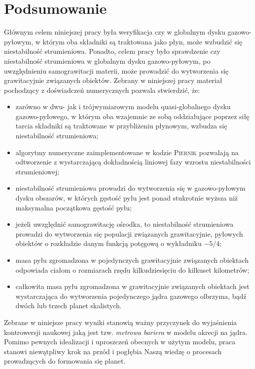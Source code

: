 
\chapter{Podsumowanie}

Głównym celem niniejszej pracy była weryfikacja czy w globalnym dysku
gazowo-pyłowym, w którym oba składniki są traktowana jako płyn, może wzbudzić
się niestabilność strumieniowa. Ponadto, celem pracy było sprawdzenie czy
niestabilność strumieniowa w globalnym dysku gazowo-pyłowym, po uwzględnieniu
samograwitacji materii, może prowadzić do wytworzenia się grawitacyjnie
związanych obiektów. Zebrany w niniejszej pracy materiał pochodzący z
doświadczeń numerycznych pozwala stwierdzić, że:
\begin{itemize}
   \item zarówno w dwu- jak i trójwymiarowym modelu quasi-globalnego dysku
      gazowo-pyłowego, w którym oba wzajemnie ze sobą oddziałujące poprzez siłę
      tarcia składniki są traktowane w przybliżeniu płynowym, wzbudza się
      niestabilność strumieniowa;
   \item algorytmy numeryczne zaimplementowane w kodzie \textsc{Piernik}
      pozwalają na odtworzenie z wystarczającą dokładnością liniowej fazy
      wzrostu niestabilności strumieniowej;
   \item niestabilność strumieniowa prowadzi do wytworzenia się w gazowo-pyłowym
      dysku obszarów, w których gęstość pyłu jest ponad stukrotnie wyższa niż
      maksymalna początkowa gęstość pyłu;
   \item jeżeli uwzględnić samograwitację ośrodka, to niestabilność strumieniowa
      prowadzi do wytworzenia się populacji związanych grawitacyjnie, pyłowych
      obiektów o rozkładzie danym funkcją potęgową o wykładniku $-5/4$;
   \item masa pyłu zgromadzona w pojedynczych grawitacyjnie związanych obiektach
      odpowiada ciałom o rozmiarach rzędu kilkudziesięciu do kilkuset
      kilometrów;
   \item całkowita masa pyłu zgromadzona w grawitacyjnie związanych obiektach
      jest wystarczająca do wytworzenia pojedynczego jądra gazowego
      olbrzyma, bądź dwóch lub trzech planet skalistych.
\end{itemize}
Zebrane w niniejsze pracy wyniki stanowią ważny przyczynek do wyjaśnienia
kontrowersji naukowej jaką jest tzw. \emph{metrowa bariera} w modelu akrecji na
jądra. Pomimo pewnych idealizacji i uproszczeń obecnych w użytym modelu, praca
stanowi niewątpliwy krok na przód i pogłębia Naszą wiedzę o procesach
prowadzących do formowania się planet.

